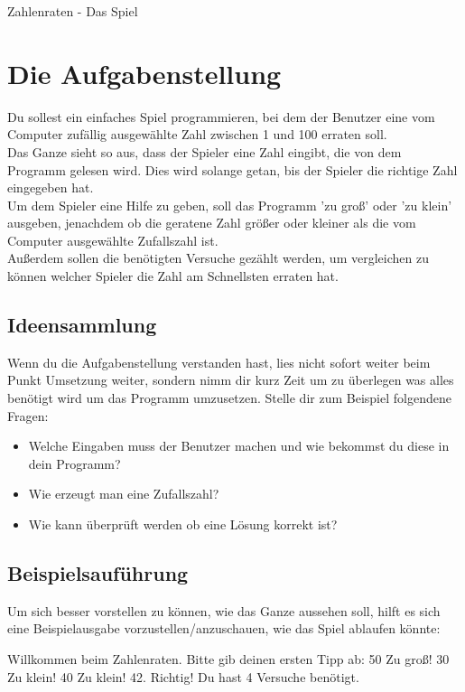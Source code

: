 \documentclass{\VorlagenPfad/coderdojokatext}
\newcommand{\Titel}{Zahlenraten - Das Spiel}
\begin{document}
\setcounter{chapter}{1}

\begin{center}
	{\huge \Titel}
\end{center}

\section{Die Aufgabenstellung} Du sollest ein einfaches Spiel programmieren, bei dem der Benutzer eine vom Computer zufällig ausgewählte Zahl zwischen 1 und 100 erraten soll.
\\Das Ganze sieht so aus, dass der Spieler eine Zahl eingibt, die von dem Programm gelesen wird. Dies wird solange getan, bis der Spieler die richtige Zahl eingegeben hat.
\\
Um dem Spieler eine Hilfe zu geben, soll das Programm 'zu groß' oder 'zu klein' ausgeben, jenachdem ob die geratene Zahl größer oder kleiner als die vom Computer ausgewählte Zufallszahl ist.
\\Außerdem sollen die benötigten Versuche gezählt werden, um vergleichen zu können welcher Spieler die Zahl am Schnellsten erraten hat.

\subsection{Ideensammlung} Wenn du die Aufgabenstellung verstanden hast, lies nicht sofort weiter beim Punkt Umsetzung weiter, sondern nimm dir kurz Zeit um zu überlegen was alles benötigt wird um das Programm umzusetzen. Stelle dir zum Beispiel folgendene Fragen:
\begin{itemize}
	\item Welche Eingaben muss der Benutzer machen und wie bekommst du diese in dein Programm?
	\item Wie erzeugt man eine Zufallszahl?
	\item Wie kann überprüft werden ob eine Lösung korrekt ist?
\end{itemize}

\subsection{Beispielsauführung} Um sich besser vorstellen zu können, wie das Ganze aussehen soll, hilft es sich eine Beispielausgabe vorzustellen/anzuschauen, wie das Spiel ablaufen könnte:

\begin{pseudocode}
Willkommen beim Zahlenraten. Bitte gib deinen ersten Tipp ab:
50
Zu groß!
30
Zu klein!
40
Zu klein!
42.
Richtig! Du hast 4 Versuche benötigt.
\end{pseudocode}
\end{document}
